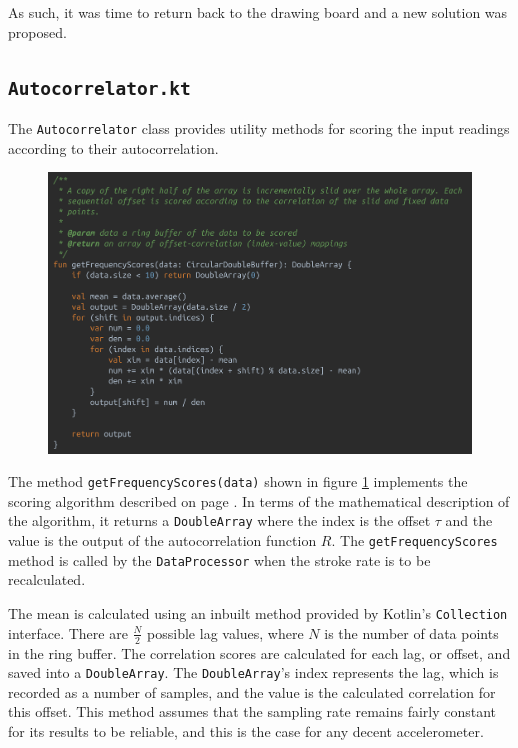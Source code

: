 \documentclass[11pt,twoside,a4paper]{report}
\begin{document}
As such, it was time to return back to the drawing board and a new solution was proposed.

\subsection{\texttt{Autocorrelator.kt}}\label{Autocorrelatorkt}

The \texttt{Autocorrelator} class provides utility methods for scoring the input readings according to their autocorrelation.

\begin{figure}[h!]
  \centering
  \includegraphics[width=1.0\textwidth]{code-autocorrelator-getFrequencyScores.png}
  \caption{}
  \label{fig:getFrequencyScores}
\end{figure}

The method \texttt{getFrequencyScores(data)} shown in figure \ref{fig:getFrequencyScores} implements the scoring algorithm described on page \pageref{par:autoCorAlgo}. In terms of the mathematical description of the algorithm, it returns a \texttt{DoubleArray} where the index is the offset $\tau$ and the value is the output of the autocorrelation function $R$. The \texttt{getFrequencyScores} method is called by the \texttt{DataProcessor} when the stroke rate is to be recalculated.

The mean is calculated using an inbuilt method provided by Kotlin's \texttt{Collection} interface.
There are $\frac{N}{2}$ possible lag values, where $N$ is the number of data points in the ring buffer.
The correlation scores are calculated for each lag, or offset, and saved into a \texttt{DoubleArray}. The \texttt{DoubleArray}'s index represents the lag, which is recorded as a number of samples, and the value is the calculated correlation for this offset. This method assumes that the sampling rate remains fairly constant for its results to be reliable, and this is the case for any decent accelerometer.
\end{document}
